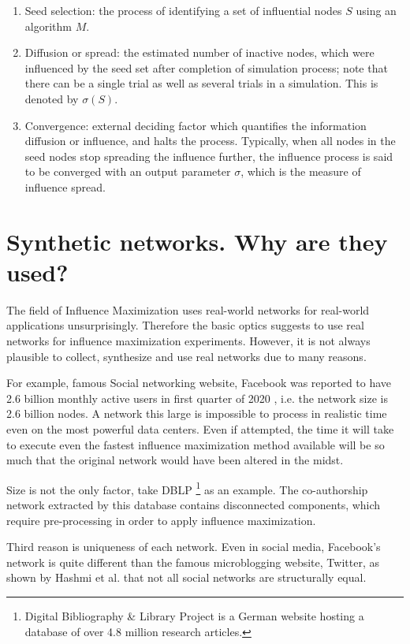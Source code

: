 	\begin{enumerate}
		\item Seed selection: the process of identifying a set of influential nodes $S$ using an algorithm $M$.
		
		\item Diffusion or spread: the estimated number of inactive nodes, which were influenced by the seed set after completion of simulation process; note that there can be a single trial as well as several trials in a simulation. This is denoted by $\sigma(S)$.
		
		\item Convergence: external deciding factor which quantifies the information diffusion or influence, and halts the process. Typically, when all nodes in the seed nodes stop spreading the influence further, the influence process is said to be converged with an output parameter $\sigma$, which is the measure of influence spread.
	\end{enumerate}


	\section{Synthetic networks. Why are they used?}
	\label{sec:domain-synthetic-nets}
	The field of Influence Maximization uses real-world networks for real-world applications unsurprisingly. Therefore the basic optics suggests to use real networks for influence maximization experiments. However, it is not always plausible to collect, synthesize and use real networks due to many reasons.
	
	For example, famous Social networking website, Facebook was reported to have 2.6 billion monthly active users in first quarter of 2020 \cite{nasdaq2020}, i.e. the network size is 2.6 billion nodes. A network this large is impossible to process in realistic time even on the most powerful data centers. Even if attempted, the time it will take to execute even the fastest influence maximization method available will be so much that the original network would have been altered in the midst.
	
	Size is not the only factor, take DBLP \footnote{Digital Bibliography \& Library Project is a German website hosting a database of over 4.8 million research articles.} as an example. The co-authorship network extracted by this database contains disconnected components, which require pre-processing in order to apply influence maximization.
	
	Third reason is uniqueness of each network. Even in social media, Facebook's network is quite different than the famous microblogging website, Twitter, as shown by Hashmi et al. \cite{hashmi2012} that not all social networks are structurally equal.
	
